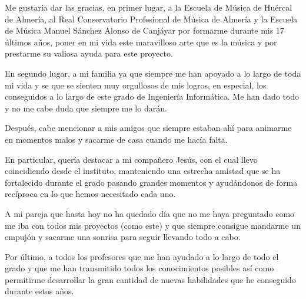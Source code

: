 Me gustaría dar las gracias, en primer lugar, a la Escuela de Música de Huércal de Almería, al Real Conservatorio Profesional de Música de Almería y la Escuela de Música Manuel Sánchez Alonso de Canjáyar por formarme durante mis 17 últimos años, poner en mi vida este maravilloso arte que es la música y por prestarme su valiosa ayuda para este proyecto.

En segundo lugar, a mi familia ya que siempre me han apoyado a lo largo de toda mi vida y se que se sienten muy orgullosos de mis logros, en especial, los conseguidos a lo largo de este grado de Ingeniería Informática. Me han dado todo y no me cabe duda que siempre me lo darán.

Después, cabe mencionar a mis amigos que siempre estaban ahí para animarme en momentos malos y sacarme de casa cuando me hacía falta. 

En particular, quería destacar a mi compañero Jesús, con el cual llevo coincidiendo desde el instituto, manteniendo una estrecha amistad que se ha fortalecido durante el grado pasando grandes momentos y ayudándonos de forma recíproca en lo que hemos necesitado cada uno.

A mi pareja que hasta hoy no ha quedado día que no me haya preguntado como me iba con todos mis proyectos (como este) y que siempre consigue mandarme un empujón y sacarme una sonrisa para seguir llevando todo a cabo.

Por último, a todos los profesores que me han ayudado a lo largo de todo el grado y que me han transmitido todos los conocimientos posibles así como permitirme desarrollar la gran cantidad de nuevas habilidades que he conseguido durante estos años.